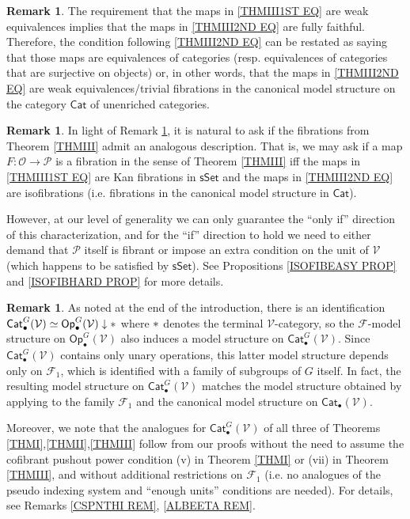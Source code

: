 \documentclass[a4paper,10pt
,draft
]{article}%
\numberwithin{equation}{section}
\numberwithin{figure}{section}
\theoremstyle{definition} %
\newtheorem{remark}[equation]{Remark}%
\newcommand{\Cat}{\mathsf{Cat}}
\newcommand{\Op}{\mathsf{Op}}%
\newcommand{\F}{\ensuremath{\mathcal F}}
\newcommand{\V}{\ensuremath{\mathcal V}}
\renewcommand{\O}{\ensuremath{\mathcal O}}
\renewcommand{\P}{\ensuremath{\mathcal P}}
\newcommand{\1}{\ensuremath{\mathbbm 1}}%
\begin{document}
\begin{remark}\label{WETRFCAN REM}
The requirement that the maps in 
\eqref{THMIII1ST EQ}
are weak equivalences implies that the maps in
\eqref{THMIII2ND EQ}
are fully faithful.
Therefore, the condition following \eqref{THMIII2ND EQ}
can be restated as saying that those maps are
equivalences of categories (resp. equivalences of categories that are surjective on objects) or, in other words,
that the maps in \eqref{THMIII2ND EQ}
are weak equivalences/trivial fibrations in the canonical model structure on the category $\mathsf{Cat}$ of unenriched categories.
\end{remark}




\begin{remark}\label{FIBSALT REM}
	In light of Remark \ref{WETRFCAN REM}, 
	it is natural to ask if the fibrations from Theorem \ref{THMIII}
	admit an analogous description.
	That is, we may ask if a map $F\colon \O \to \mathcal{P}$
	is a fibration in the sense of Theorem \ref{THMIII}
	iff the maps in 
	\eqref{THMIII1ST EQ}
	are Kan fibrations in $\mathsf{sSet}$
	and the maps in
	\eqref{THMIII2ND EQ}
	are isofibrations (i.e. fibrations in the canonical model structure in $\mathsf{Cat}$).
	
	However, at our level of generality we can only guarantee the 
	``only if'' direction of this characterization,
	and for the ``if'' direction to hold we need to either demand
	that $\P$ itself is fibrant or
	impose an extra condition on the unit of $\V$ (which happens to be satisfied by $\mathsf{sSet}$).
	See Propositions \ref{ISOFIBEASY PROP} and \ref{ISOFIBHARD PROP} for more details.
\end{remark}



\begin{remark}
	As noted at the end of the introduction, 
	there is an identification
	$\Cat_\bullet^G(\V) \simeq \Op_\bullet^G(\V) \downarrow \**$
	where $\**$ denotes the terminal $\V$-category,
	so the $\F$-model structure on $\Op_\bullet^G(\V)$
	also induces a model structure on
	$\Cat_\bullet^G(\V)$.
	Since $\Cat_\bullet^G(\V)$ contains only unary operations,
	this latter model structure depends only on $\F_1$,
	which is identified with a family of subgroups of $G$ itself.
	In fact, the resulting model structure on 
	$\Cat_\bullet^G(\V)$ matches the model structure 
	obtained by applying \cite{Ste16}
	to the family $\F_1$ and the canonical model structure on
	$\Cat_\bullet(\V)$.

	Moreover, we note that the analogues for $\Cat_\bullet^G(\V)$
	of all three of Theorems \ref{THMI},\ref{THMII},\ref{THMIII}
	follow from our proofs without the need 
	to assume the cofibrant pushout power condition (v)
	in Theorem \ref{THMI}
	or (vii) in Theorem \ref{THMIII},
	and without additional restrictions on $\F_1$
	(i.e. no analogues of the  pseudo indexing system and ``enough units'' conditions are needed).
	For details, see Remarks \ref{CSPNTHI REM}, \ref{ALBEETA REM}.
\end{remark}
\end{document}
